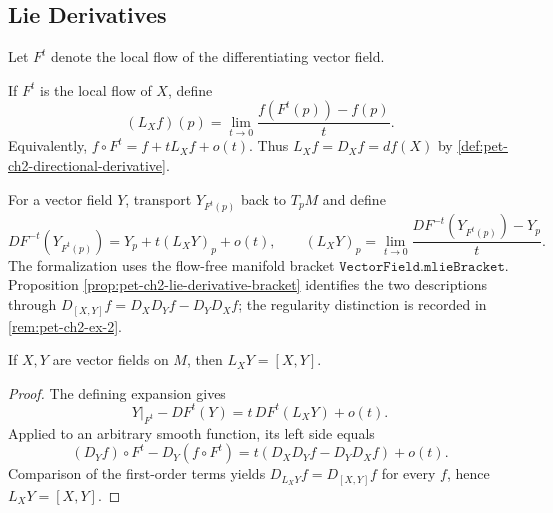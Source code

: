 \subsection{Lie Derivatives}

Let $F^t$ denote the local flow of the differentiating vector field.

\begin{definition}
  \label{def:pet-ch2-lie-derivative-function}


  If $F^t$ is the local flow of
  $X$, define
  \[
    (L_Xf)(p)
      =\lim_{t\to0}\frac{f(F^t(p))-f(p)}t.
  \]
  Equivalently, $f\circ F^t=f+tL_Xf+o(t)$. Thus
  $L_Xf=D_Xf=df(X)$ by
  \cref{def:pet-ch2-directional-derivative}.
\end{definition}

\begin{definition}
  \label{def:pet-ch2-lie-derivative-vector-field}


  For a vector field $Y$,
  transport $Y_{F^t(p)}$ back to $T_pM$ and define
  \[
    DF^{-t}(Y_{F^t(p)})
      =Y_p+t(L_XY)_p+o(t),
    \qquad
    (L_XY)_p
      =\lim_{t\to0}
         \frac{DF^{-t}(Y_{F^t(p)})-Y_p}{t}.
  \]
  The formalization uses the flow-free manifold bracket
  $\texttt{VectorField.mlieBracket}$. Proposition
  \cref{prop:pet-ch2-lie-derivative-bracket} identifies the two descriptions
  through
  $D_{[X,Y]}f=D_XD_Yf-D_YD_Xf$; the regularity distinction is recorded in
  \cref{rem:pet-ch2-ex-2}.
\end{definition}

\begin{proposition}
  \label{prop:pet-ch2-lie-derivative-bracket}


  If $X,Y$ are vector fields on $M$, then $L_XY=[X,Y]$.
\end{proposition}
\begin{proof}

  \sketch
  The defining expansion gives
  \[
    Y|_{F^t}-DF^t(Y)=t\,DF^t(L_XY)+o(t).
  \]
  Applied to an arbitrary smooth function, its left side equals
  \[
    (D_Yf)\circ F^t-D_Y(f\circ F^t)
      =t(D_XD_Yf-D_YD_Xf)+o(t).
  \]
  Comparison of the first-order terms yields
  $D_{L_XY}f=D_{[X,Y]}f$ for every $f$, hence $L_XY=[X,Y]$.
\end{proof}

